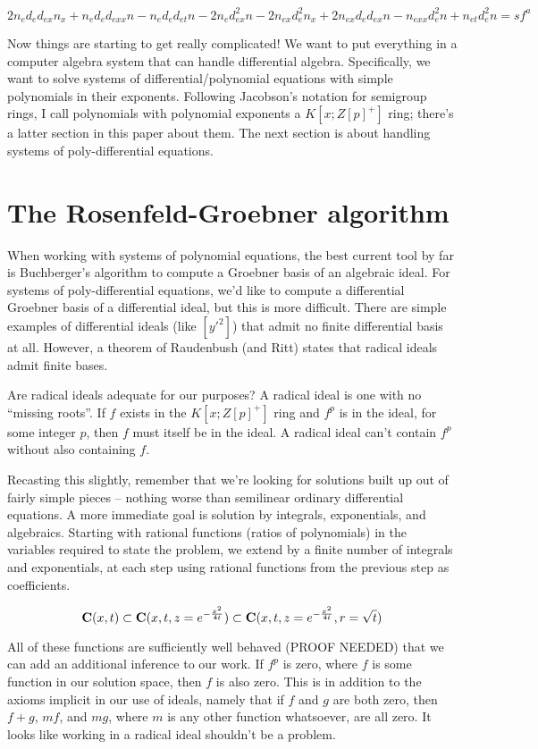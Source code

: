 \documentclass{article}
\newcommand{\C}{\ensuremath{{\bf C}}}
\begin{document}
$$2n_ed_ed_{ex}n_x +n_ed_ed_{exx}n -n_ed_ed_{et}n -2n_ed_{ex}^{2}n -2n_{ex}d_e^{2}n_x +2n_{ex}d_ed_{ex}n -n_{exx}d_e^{2}n +n_{et}d_e^{2}n = s f^a$$


Now things are starting to get really complicated!  We want to put
everything in a computer algebra system that can handle differential
algebra.  Specifically, we want to solve systems of
differential/polynomial equations with simple polynomials in their
exponents.  Following Jacobson's notation for semigroup rings, I call
polynomials with polynomial exponents a $K[x; Z[p]^+]$ ring; there's a
latter section in this paper about them.  The next section is about
handling systems of poly-differential equations.


\vfill\eject
\section*{The Rosenfeld-Groebner algorithm}

When working with systems of polynomial equations, the best current
tool by far is Buchberger's algorithm to compute a Groebner basis of
an algebraic ideal.  For systems of poly-differential equations, we'd
like to compute a differential Groebner basis of a differential ideal,
but this is more difficult.  There are simple examples of differential
ideals (like $[y'^2]$) that admit no finite differential basis at all.
However, a theorem of Raudenbush (and Ritt) states that radical ideals
admit finite bases.

Are radical ideals adequate for our purposes?  A radical ideal is one
with no ``missing roots''.  If $f$ exists in the $K[x; Z[p]^+]$ ring and
$f^p$ is in the ideal, for some integer $p$, then $f$ must itself be
in the ideal.  A radical ideal can't contain $f^p$ without also
containing $f$.

Recasting this slightly, remember that we're looking for solutions
built up out of fairly simple pieces -- nothing worse than semilinear
ordinary differential equations.  A more immediate goal is solution by
integrals, exponentials, and algebraics.  Starting with rational
functions (ratios of polynomials) in the variables required to state
the problem, we extend by a finite number of integrals and
exponentials, at each step using rational functions from the previous
step as coefficients.

$$\C(x,t) \subset \C(x,t,z=e^{-\frac{x^2}{4t}}) \subset \C(x,t,z=e^{-\frac{x^2}{4t}},r=\sqrt{t})$$

All of these functions are sufficiently well behaved (PROOF NEEDED)
that we can add an additional inference to our work.  If $f^p$ is
zero, where $f$ is some function in our solution space, then $f$ is
also zero.  This is in addition to the axioms implicit in our use of
ideals, namely that if $f$ and $g$ are both zero, then $f+g$, $mf$,
and $mg$, where $m$ is any other function whatsoever, are all zero.
It looks like working in a radical ideal shouldn't be a problem.
\end{document}
